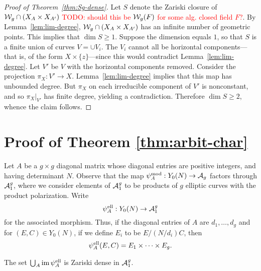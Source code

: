 \documentclass{amsart}
\begin{document}
\begin{proof}[Proof of Theorem~\ref{thm:Sg-dense}]
  Let $S$ denote the Zariski closure of $\mathcal{W}_g \cap (X_A \times X_{A'})$ \textcolor{red}{TODO: should this be $\mathcal{W}_g(F)$ for some alg. closed field $F$?}. By Lemma~\ref{lem:lim-degree}, $\mathcal{W}_g \cap (X_A \times X_{A'})$ has an infinite number of geometric points. This implies that $\dim S \geq 1$. Suppose the dimension equals $1$, so that $S$ is a finite union of curves $V = \cup V_i$. The $V_i$ cannot all be horizontal components---that is, of the form $X \times \{z\}$---since this would contradict Lemma~\ref{lem:lim-degree}. Let $V'$ be $V$ with the horizontal components removed. Consider the projection $\pi_X: V' \to X$. Lemma~\ref{lem:lim-degree} implies that this map has unbounded degree. But $\pi_X$ on each irreducible component of $V'$ is nonconstant, and so $\pi_X|_{V'}$ has finite degree, yielding a contradiction. Therefore $\dim S \geq 2$, whence the claim follows.
\end{proof}







\section{Proof of Theorem \ref{thm:arbit-char}}
\label{sec:characteristic-p}

Let $A$ be a $g \times g$ diagonal matrix whose diagonal entries are positive integers, and having determinant $N$. Observe that the map $\psi_{A}^\mathrm{mod}: Y_0(N) \to \mathcal{A}_g$ factors through $\mathcal{A}_1^g$, where we consider elements of $\mathcal{A}_1^g$ to be products of $g$ elliptic curves with the product polarization. Write
\[
\psi_{A}^\mathrm{ell}: Y_0(N) \to \mathcal{A}_1^g
\]
for the associated morphism. Thus, if the diagonal entries of $A$ are $d_1, \ldots, d_g$ and for $(E, C) \in Y_0(N)$, if we define $E_i$ to be $E/(N/d_i)C$, then
\[
  \psi_{A}^\mathrm{ell}(E,C) = E_1 \times \cdots \times E_g.
\]

\begin{theorem}\label{thm:char-p-version}
  The set $\bigcup_A \operatorname{im}\psi_{A}^\mathrm{ell}$ is Zariski dense in $\mathcal{A}_1^g$.
\end{theorem}
\end{document}
